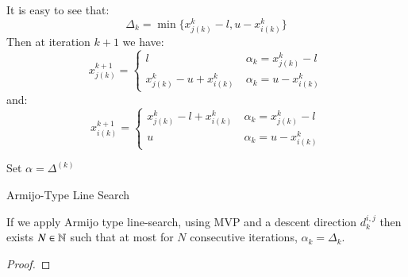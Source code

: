 It is easy to see that:
\begin{equation*}
\Delta_k=\min \{ x^k_{j(k)}-l, u-x^k_{i(k)}\}
\end{equation*}
Then at iteration $k+1$ we have:
\begin{equation*}
x^{k+1}_{j(k)}=\begin{cases}
 l \ &\alpha_k=x^k_{j(k)}-l\\
 x^k_{j(k)}-u+x^k_{i(k)} \ &\alpha_k=u-x^k_{i(k)}
 \end{cases}
\end{equation*}
and:
\begin{equation*}
x^{k+1}_{i(k)}=\begin{cases}
 x^k_{j(k)}-l+x^k_{i(k)} \ &\alpha_k=x^k_{j(k)}-l\\
 u \ &\alpha_k=u-x^k_{i(k)}
 \end{cases}
\end{equation*}


\begin{algorithm}
 Set $\alpha = \Delta^{(k)}$\\
 \caption{Armijo-Type Line Search}
\end{algorithm}

\begin{proposition}\label{proposition:david}
 If we apply Armijo type line-search, using MVP and a descent direction $d_k^{i,j}$ then exists $N \in \mathbb{N}$ such that at most for $N$ consecutive iterations, $\alpha_k=\Delta_k$.
\end{proposition}
\begin{proof}
\end{proof}

